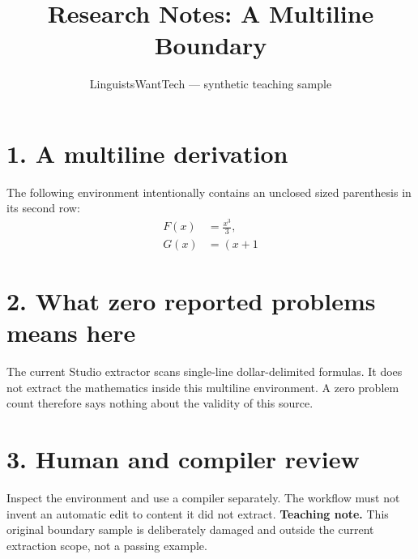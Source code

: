 \documentclass[12pt]{article}
\title{Research Notes: A Multiline Boundary}
\author{LinguistsWantTech --- synthetic teaching sample}
\date{}
\begin{document}
\maketitle
\section*{1. A multiline derivation}
The following environment intentionally contains an unclosed sized
parenthesis in its second row:
\begin{align*}
F(x) &= \frac{x^3}{3}, \\
G(x) &= \left( x+1
\end{align*}
\section*{2. What zero reported problems means here}
The current Studio extractor scans single-line dollar-delimited
formulas. It does not extract the mathematics inside this multiline
environment. A zero problem count therefore says nothing about the
validity of this source.
\section*{3. Human and compiler review}
Inspect the environment and use a compiler separately. The workflow
must not invent an automatic edit to content it did not extract.
\textbf{Teaching note.} This original boundary sample is deliberately
damaged and outside the current extraction scope, not a passing example.
\end{document}
